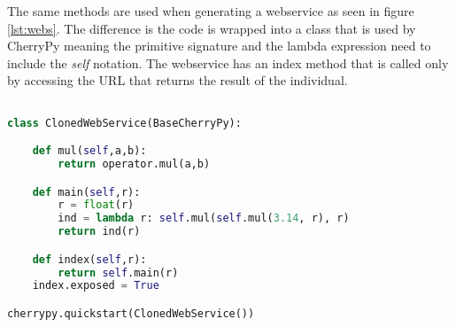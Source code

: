 The same methods are used when generating a webservice as seen in figure \ref{lst:webs}. The difference is the code is wrapped into a class that is used
by CherryPy meaning the primitive signature and the lambda expression need to include the \textit{self} notation. The webservice has
an index method that is called only by accessing the URL that returns the result of the individual.

\begin{lstlisting}[language=Python,caption={A generated web service that is the result of the Darwin framework},label={lst:webs}]

class ClonedWebService(BaseCherryPy):

    def mul(self,a,b):
        return operator.mul(a,b)

    def main(self,r):
        r = float(r)
        ind = lambda r: self.mul(self.mul(3.14, r), r)
        return ind(r)

    def index(self,r):
        return self.main(r)
    index.exposed = True

cherrypy.quickstart(ClonedWebService())
\end{lstlisting}